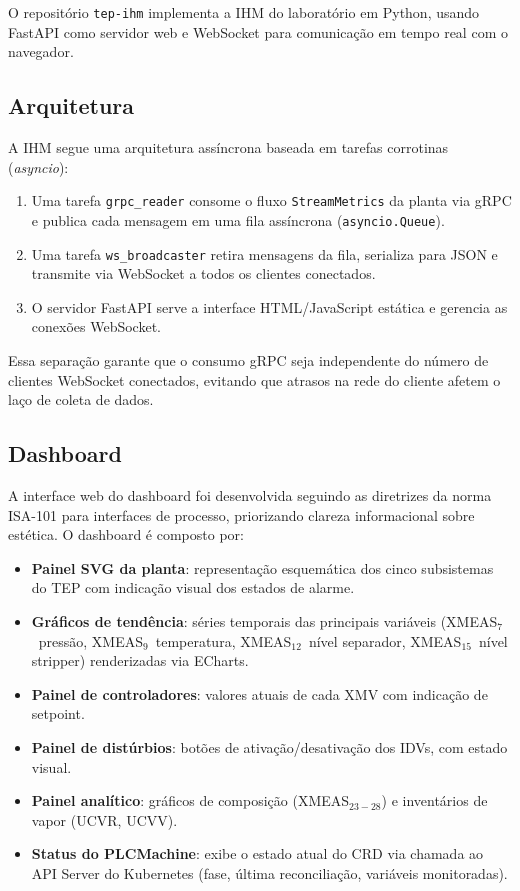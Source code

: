 O repositório \texttt{tep-ihm} implementa a IHM do laboratório em Python, usando FastAPI como servidor web e WebSocket para comunicação em tempo real com o navegador.

\subsection{Arquitetura}

A IHM segue uma arquitetura assíncrona baseada em tarefas corrotinas (\textit{asyncio}):

\begin{enumerate}
  \item Uma tarefa \texttt{grpc\_reader} consome o fluxo \texttt{StreamMetrics} da planta via gRPC e publica cada mensagem em uma fila assíncrona (\texttt{asyncio.Queue}).
  \item Uma tarefa \texttt{ws\_broadcaster} retira mensagens da fila, serializa para JSON e transmite via WebSocket a todos os clientes conectados.
  \item O servidor FastAPI serve a interface HTML/JavaScript estática e gerencia as conexões WebSocket.
\end{enumerate}

Essa separação garante que o consumo gRPC seja independente do número de clientes WebSocket conectados, evitando que atrasos na rede do cliente afetem o laço de coleta de dados.

\subsection{Dashboard}

A interface web do dashboard foi desenvolvida seguindo as diretrizes da norma ISA-101 para interfaces de processo, priorizando clareza informacional sobre estética. O dashboard é composto por:

\begin{itemize}
  \item \textbf{Painel SVG da planta}: representação esquemática dos cinco subsistemas do TEP com indicação visual dos estados de alarme.
  \item \textbf{Gráficos de tendência}: séries temporais das principais variáveis (XMEAS$_7$~pressão, XMEAS$_9$~temperatura, XMEAS$_{12}$~nível separador, XMEAS$_{15}$~nível stripper) renderizadas via ECharts.
  \item \textbf{Painel de controladores}: valores atuais de cada XMV com indicação de setpoint.
  \item \textbf{Painel de distúrbios}: botões de ativação/desativação dos IDVs, com estado visual.
  \item \textbf{Painel analítico}: gráficos de composição (XMEAS$_{23-28}$) e inventários de vapor (UCVR, UCVV).
  \item \textbf{Status do PLCMachine}: exibe o estado atual do CRD via chamada ao API Server do Kubernetes (fase, última reconciliação, variáveis monitoradas).
\end{itemize}

